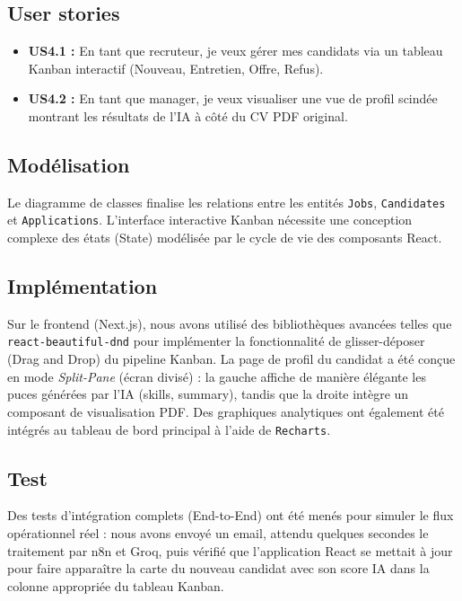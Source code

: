 \subsection{User stories}
\begin{itemize}
    \item \textbf{US4.1 :} En tant que recruteur, je veux gérer mes candidats via un tableau Kanban interactif (Nouveau, Entretien, Offre, Refus).
    \item \textbf{US4.2 :} En tant que manager, je veux visualiser une vue de profil scindée montrant les résultats de l'IA à côté du CV PDF original.
\end{itemize}

\subsection{Modélisation}
Le diagramme de classes finalise les relations entre les entités \texttt{Jobs}, \texttt{Candidates} et \texttt{Applications}. L'interface interactive Kanban nécessite une conception complexe des états (State) modélisée par le cycle de vie des composants React.

\subsection{Implémentation}
Sur le frontend (Next.js), nous avons utilisé des bibliothèques avancées telles que \texttt{react-beautiful-dnd} pour implémenter la fonctionnalité de glisser-déposer (Drag and Drop) du pipeline Kanban. La page de profil du candidat a été conçue en mode \textit{Split-Pane} (écran divisé) : la gauche affiche de manière élégante les puces générées par l'IA (skills, summary), tandis que la droite intègre un composant de visualisation PDF. Des graphiques analytiques ont également été intégrés au tableau de bord principal à l'aide de \texttt{Recharts}.


\subsection{Test}
Des tests d'intégration complets (End-to-End) ont été menés pour simuler le flux opérationnel réel : nous avons envoyé un email, attendu quelques secondes le traitement par n8n et Groq, puis vérifié que l'application React se mettait à jour pour faire apparaître la carte du nouveau candidat avec son score IA dans la colonne appropriée du tableau Kanban.

